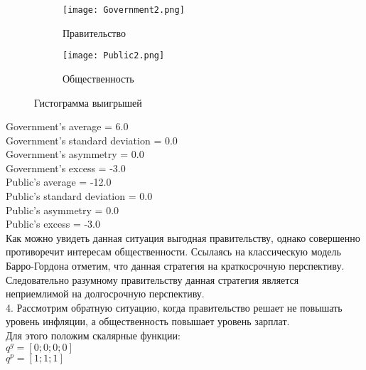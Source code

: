 	\begin{figure}[h]
		
		\begin{subfigure}{0.5\textwidth}
			\texttt{[image: Government2.png]} 
			\caption{Правительство}
			\label{fig:government2}
		\end{subfigure}
		\begin{subfigure}{0.5\textwidth}
			\texttt{[image: Public2.png]}
			\caption{Общественность}
			\label{fig:public2}
		\end{subfigure}
		
		\caption{Гистограмма выигрышей}
		\label{fig:stat2}
	\end{figure}
	
	Government's average = 6.0\\
	Government's standard deviation = 0.0\\
	Government's asymmetry = 0.0\\
	Government's excess = -3.0\\
	Public's average = -12.0\\
	Public's standard deviation = 0.0\\
	Public's asymmetry = 0.0\\
	Public's excess = -3.0\\
	
	
Как можно увидеть данная ситуация выгодная правительству, однако совершенно противоречит интересам общественности. Ссылаясь на  классическую модель Барро-Гордона отметим, что данная стратегия на краткосрочную перспективу. Следовательно разумному правительству данная стратегия является неприемлимой на долгосрочную перспективу.\\


4. Рассмотрим обратную ситуацию, когда правительство решает не повышать уровень инфляции, а общественность повышает уровень зарплат.\\
	 	Для этого положим скалярные функции:\\
	 	$q^g =[ 0; 0; 0; 0 ]$ \\
	 	$q^p=[ 1; 1; 1] $ \\
 

